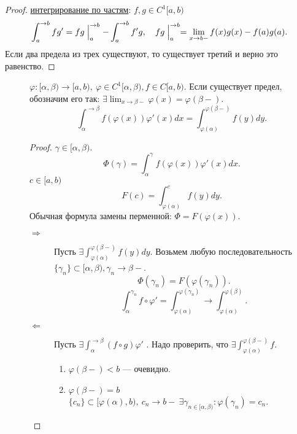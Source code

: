 \begin{prop}
\begin{proof}
	\underline{интегрирование по частям}: 
	$ f, g \in  C^{1}[a, b)$
	\[
	    \int_{a}^{ \to b} f g' = fg \Bigm|_a^{ \to  b} - \int_{a}^{ \to b}  f' g, \quad fg \Bigm|_a^{ \to b} = \lim_{x \to b-} f(x) g(x) - f(a)g(a)
	.\]
	Если два предела из трех существуют, то существует третий и верно это равенство.
    \end{proof}
    \begin{description}
\item []
    $ \varphi : [ \alpha , \beta ) \to [a, b) , ~ \varphi  \in C^{1}[ \alpha , \beta ), f \in C[a, b)$. Если существует предел, обозначим его так: $ \exists \lim_{x \to  \beta -}  \varphi (x) = \varphi ( \beta -)$.
    \[
	\int_{ \alpha }^{ \to \beta } f( \varphi (x)) \varphi '(x) dx = \int_{ \varphi ( \alpha ) }^{ \varphi (\beta -)} f(y) dy
    .\]
    \begin{proof}
	$ \gamma  \in [ \alpha , \beta )$. \[
	    \Phi (\gamma) = \int_{ \alpha}^{\gamma}  f( \varphi (x)) \varphi '(x) dx
	.\]
	$ c \in  [a, b)$
	\[
	    F(c) =\int_{ \varphi (\alpha)}^{c } f(y) dy
	.\]
	Обычная формула замены перменной: $ \Phi = F( \varphi (x))$.
	\begin{description}
	    \item [$\boxed{ \Longrightarrow }$]  Пусть $ \exists  \int_{ \varphi ( \alpha )}^{ \varphi (\beta-)}  f(y) dy$. Возьмем любую последовательность $ \{ \gamma_n \} \subset [ \alpha , \beta ),  \gamma _n \to  \beta  -$.
		\[
		    \Phi(\gamma_n) = F( \varphi (\gamma_n))
		.\]
		\[
		    \int_{ \alpha }^{ \gamma_n} f \circ \varphi ' = \int_{ \varphi ( \alpha )}^{ \varphi (\gamma_n)} \to \int_{\varphi(\alpha)}^{\varphi(\beta)}
		.\]
	    \item [$\boxed{ \Longleftarrow }$]  Пусть $ \exists \int_{\alpha}^{ \to \beta }(f \circ g) \varphi '  $
		. Надо проверить, что $ \exists  \int_{ \varphi ( \alpha )}^{ \varphi (\beta -)} f $.
		\begin{enumerate}
		    \item $ \varphi (\beta-) < b$ --- очевидно.
		    \item $ \varphi (\beta -) = b$
			$ \{ c_n \} \subset [ \varphi ( \alpha ), b) ,  ~ c_n \to  b- ~ \exists \gamma_{n \in[ \alpha , \beta )}: \varphi ( \gamma_n) = c_n$.


\end{enumerate}
\end{description}
\end{proof}
\end{description}
\end{prop}

